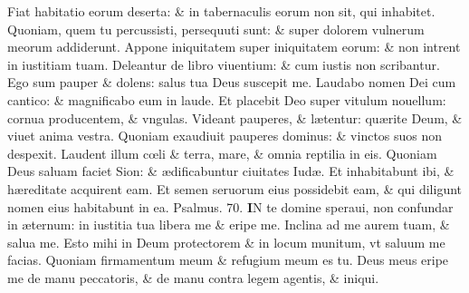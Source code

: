 \documentclass[a5paper,10pt]{book}
\def\ae{æ}
\def\oe{œ}
\begin{document}
\begin{multicols*}{2}
\newline \color{red} F\color{black}iat habitatio eorum deserta: \& in tabernaculis eorum non sit, qui inhabitet.
\newline \color{red} Q\color{black}uoniam, quem tu percussisti, persequuti sunt: \& super dolorem vulnerum meorum addiderunt.
\newline \color{red} A\color{black}ppone iniquitatem super iniquitatem eorum: \& non intrent in iustitiam tuam.
\newline \color{red} D\color{black}eleantur de libro viuentium: \& cum iustis non scribantur.
\newline \color{red} E\color{black}go sum pauper \& dolens: salus tua Deus suscepit me.
\newline \color{red} L\color{black}audabo nomen Dei cum cantico: \& magnificabo eum in laude.
\newline \color{red} E\color{black}t placebit Deo super vitulum nouellum: cornua producentem, \& vngulas.
\newline \color{red} V\color{black}ideant pauperes, \& l\ae tentur: qu\ae rite Deum, \& viuet anima vestra.
\newline \color{red} Q\color{black}uoniam exaudiuit pauperes dominus: \& vinctos suos non despexit.
\newline \color{red} L\color{black}audent illum c\oe li \& terra, mare, \& omnia reptilia in eis.
\newline \color{red} Q\color{black}uoniam Deus saluam faciet Sion: \& \ae dificabuntur ciuitates Iud\ae .
\newline \color{red} E\color{black}t inhabitabunt ibi, \& h\ae reditate acquirent eam.
\newline \color{red} E\color{black}t semen seruorum eius possidebit eam, \& qui diligunt nomen eius habitabunt in ea. \quad \color{red} Psalmus. \hypertarget{ps70}{70.} \color{black}
\vspace{-1em}
\lettrine[lines=2]{\bfseries \color{red} I}{}N te domine speraui, non confundar in \ae ternum: in iustitia tua libera me \& eripe me.
\newline \color{red} I\color{black}nclina ad me aurem tuam, \& salua me.
\newline \color{red} E\color{black}sto mihi in Deum protectorem \& in locum munitum, vt saluum me facias.
\newline \color{red} Q\color{black}uoniam firmamentum meum \& refugium meum es tu.
\newline \color{red} D\color{black}eus meus eripe me de manu peccatoris, \& de manu contra legem agentis, \& iniqui.

\end{multicols*}
\end{document}

